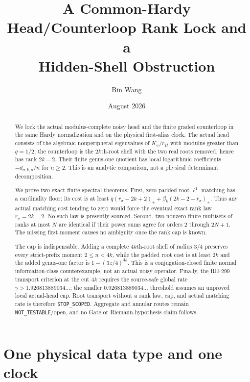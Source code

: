 \documentclass[11pt]{article}
\title{A Common-Hardy Head/Counterloop Rank Lock and a\\
Hidden-Shell Obstruction}
\author{Bin Wang}
\date{August 2026}
\theoremstyle{remark}
\begin{document}
\maketitle

\begin{abstract}
We lock the actual modulus-complete noisy head and the finite graded
counterloop in the same Hardy normalization and on the physical first-alias
clock.  The actual head consists of the algebraic nonperipheral eigenvalues
of $K_\sigma/r_H$ with modulus greater than $q=1/2$; the counterloop is the
$2k$th-root shell with the two real roots removed, hence has rank $2k-2$.
Their finite genus-one quotient has local logarithmic coefficients
$-d_{\sigma,k,n}/n$ for $n\ge2$.  This is an analytic comparison, not a
physical determinant decomposition.

We prove two exact finite-spectral theorems.  First, zero-padded root
$\ell^1$ matching has a cardinality floor: its cost is at least
$q(r_\sigma-2k+2)_++\beta_k(2k-2-r_\sigma)_+$.  Thus any actual matching
cost tending to zero would force the eventual exact rank law
$r_\sigma=2k-2$.  No such law is presently sourced.  Second, two nonzero
finite multisets of ranks at most $N$ are identical if their power sums
agree for orders $2$ through $2N+1$.  The missing first moment causes no
ambiguity once the rank cap is known.

The cap is indispensable.  Adding a complete $4k$th-root shell of radius
$3/4$ preserves every strict-prefix moment $2\le n<4k$, while the padded
root cost is at least $2k$ and the added genus-one factor is
$1-(3z/4)^{4k}$.  This is a conjugation-closed finite normal information-class
counterexample, not an actual noisy operator.  Finally, the RH-299 transport
criterion at the cut $4k$ requires the source-safe global rate
$\gamma>1.926813889034\ldots$; the smaller
$0.926813889034\ldots$ threshold assumes an unproved local actual-head cap.
Root transport without a rank law, cap, and actual matching rate is therefore
\texttt{STOP\_SCOPED}.  Aggregate and annular routes remain
\texttt{NOT\_TESTABLE}/open, and no Gate or Riemann-hypothesis claim follows.
\end{abstract}

\section{One physical data type and one clock}
\end{document}
